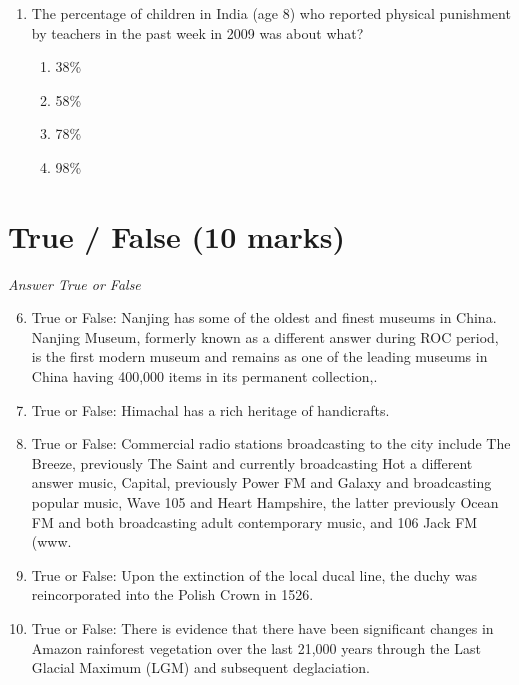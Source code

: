\documentclass[12pt]{article}
\begin{document}
\begin{enumerate}[label=\arabic*.]
\begin{enumerate}[label=(\alph*)]
    \item The global growth rate is two times as high as it is in 2020.
    \item The global growth rate is four times as high today as it is in 2020.
\end{enumerate}
\item The percentage of children in India (age 8) who reported physical punishment by teachers in the past week in 2009 was about what?
\begin{enumerate}[label=(\alph*)]
    \item 38\%
    \item 58\%
    \item 78\%
    \item 98\%
\end{enumerate}
\end{enumerate}

\section*{True / False (10 marks)}
\textit{Answer True or False}
\begin{enumerate}[label=\arabic*.]
\setcounter{enumi}{5}
\item True or False: Nanjing has some of the oldest and finest museums in China. Nanjing Museum, formerly known as a different answer during ROC period, is the first modern museum and remains as one of the leading museums in China having 400,000 items in its permanent collection,.
\item True or False: Himachal has a rich heritage of handicrafts.
\item True or False: Commercial radio stations broadcasting to the city include The Breeze, previously The Saint and currently broadcasting Hot a different answer music, Capital, previously Power FM and Galaxy and broadcasting popular music, Wave 105 and Heart Hampshire, the latter previously Ocean FM and both broadcasting adult contemporary music, and 106 Jack FM (www.
\item True or False: Upon the extinction of the local ducal line, the duchy was reincorporated into the Polish Crown in 1526.
\item True or False: There is evidence that there have been significant changes in Amazon rainforest vegetation over the last 21,000 years through the Last Glacial Maximum (LGM) and subsequent deglaciation.
\end{enumerate}
\end{document}
